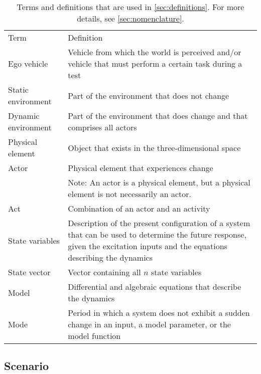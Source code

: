 \begin{table}[t]
	\cstartc\caption{Terms and definitions that are used in \cref{sec:definitions}. For more details, see \cref{sec:nomenclature}.}
	\label{tab:nomenclature}
	\begin{tabularx}{\linewidth}{lX}
		\toprule
		Term & Definition \\ \otoprule
		Ego vehicle & Vehicle from which the world is perceived and/or vehicle that must perform a certain task during a test \\
		Static environment & Part of the environment that does not change \\
		Dynamic environment & Part of the environment that does change and that comprises all actors \\
		Physical element & Object that exists in the three-dimensional space \\
		Actor & Physical element that experiences change \\
		& Note: An actor is a physical element, but a physical element is not necessarily an actor. \\
		Act & Combination of an \cstarte actor \cende and an activity \\
		State variables & Description of the present configuration of a system that can be used to determine the future response, given the excitation inputs and the equations describing the dynamics \\	
		State vector & Vector containing all $n$ state variables \\
		Model & Differential \cendc\cstartd and algebraic \cendd\cstartc equations that describe the dynamics \\
		Mode & Period in which a system does not exhibit a sudden change \cendc\cstartd in an input, a model parameter, or the model function \cendd\cstartc \\	
		\bottomrule
	\end{tabularx}\cendc
\end{table}



\subsection{Scenario}
\label{sec:scenario}

